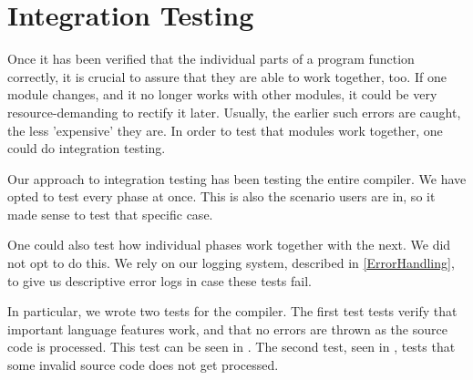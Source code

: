 \section{Integration Testing} \label{sec:IntTesting}
Once it has been verified that the individual parts of a program function correctly, it is crucial to assure that they are able to work together, too.
If one module changes, and it no longer works with other modules, it could be very resource-demanding to rectify it later.
Usually, the earlier such errors are caught, the less 'expensive' they are.
In order to test that modules work together, one could do integration testing.

Our approach to integration testing has been testing the entire compiler. We have opted to test every phase at once. This is also the scenario users are in, so it made sense to test that specific case.

One could also test how individual phases work together with the next. We did not opt to do this. We rely on our logging system, described in \ref{ErrorHandling}, to give us descriptive error logs in case these tests fail.

In particular, we wrote two tests for the \dazel{} compiler. The first test tests verify that important language features work, and that no errors are thrown as the source code is processed. This test can be seen in . The second test, seen in , tests that some invalid source code does not get processed.

